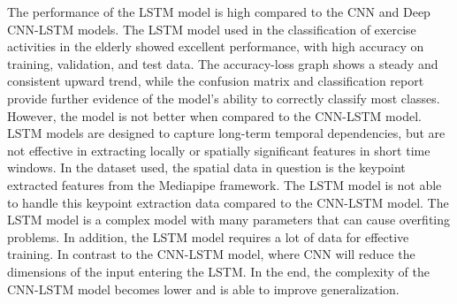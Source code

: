The performance of the LSTM model is high compared to the CNN and Deep CNN-LSTM models. The LSTM model used in the classification of exercise activities in the elderly showed excellent performance, with high accuracy on training, validation, and test data. The accuracy-loss graph shows a steady and consistent upward trend, while the confusion matrix and classification report provide further evidence of the model's ability to correctly classify most classes. However, the model is not better when compared to the CNN-LSTM model. LSTM models are designed to capture long-term temporal dependencies, but are not effective in extracting locally or spatially significant features in short time windows. In the dataset used, the spatial data in question is the keypoint extracted features from the Mediapipe framework. The LSTM model is not able to handle this keypoint extraction data compared to the CNN-LSTM model. The LSTM model is a complex model with many parameters that can cause overfiting problems. In addition, the LSTM model requires a lot of data for effective training. In contrast to the CNN-LSTM model, where CNN will reduce the dimensions of the input entering the LSTM. In the end, the complexity of the CNN-LSTM model becomes lower and is able to improve generalization.

